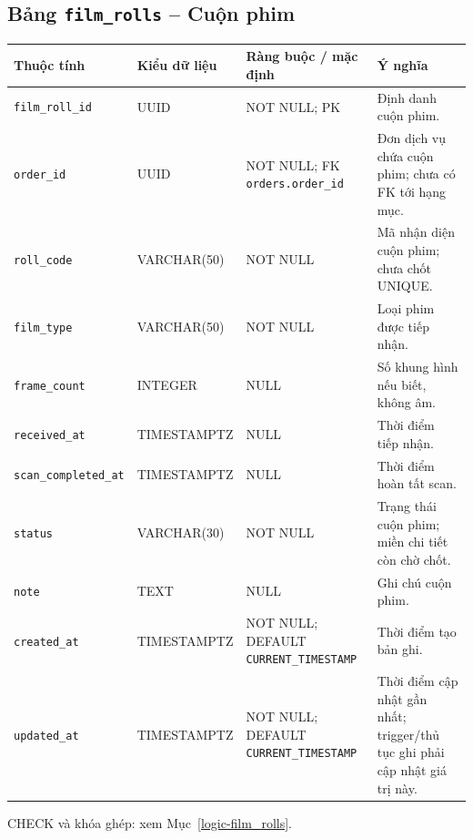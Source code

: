 \subsection{Bảng \texttt{film\_\allowbreak{}rolls} -- Cuộn phim}
\label{dictionary-film_rolls}
\begingroup
\footnotesize
\setlength{\tabcolsep}{3pt}
\begin{longtable}{>{\raggedright\arraybackslash}p{3.1cm}>{\raggedright\arraybackslash}p{2.5cm}>{\raggedright\arraybackslash}p{3.7cm}>{\raggedright\arraybackslash}p{4.3cm}}
\toprule
Thuộc tính & Kiểu dữ liệu & Ràng buộc / mặc định & Ý nghĩa \\
\midrule
\endhead
\texttt{film\_\allowbreak{}roll\_\allowbreak{}id} & UUID & NOT NULL; PK & Định danh cuộn phim. \\
\texttt{order\_\allowbreak{}id} & UUID & NOT NULL; FK \texttt{orders.order\_\allowbreak{}id} & Đơn dịch vụ chứa cuộn phim; chưa có FK tới hạng mục. \\
\texttt{roll\_\allowbreak{}code} & VARCHAR(50) & NOT NULL & Mã nhận diện cuộn phim; chưa chốt UNIQUE. \\
\texttt{film\_\allowbreak{}type} & VARCHAR(50) & NOT NULL & Loại phim được tiếp nhận. \\
\texttt{frame\_\allowbreak{}count} & INTEGER & NULL & Số khung hình nếu biết, không âm. \\
\texttt{received\_\allowbreak{}at} & TIMESTAMPTZ & NULL & Thời điểm tiếp nhận. \\
\texttt{scan\_\allowbreak{}completed\_\allowbreak{}at} & TIMESTAMPTZ & NULL & Thời điểm hoàn tất scan. \\
\texttt{status} & VARCHAR(30) & NOT NULL & Trạng thái cuộn phim; miền chi tiết còn chờ chốt. \\
\texttt{note} & TEXT & NULL & Ghi chú cuộn phim. \\
\texttt{created\_\allowbreak{}at} & TIMESTAMPTZ & NOT NULL; DEFAULT \texttt{CURRENT\_\allowbreak{}TIMESTAMP} & Thời điểm tạo bản ghi. \\
\texttt{updated\_\allowbreak{}at} & TIMESTAMPTZ & NOT NULL; DEFAULT \texttt{CURRENT\_\allowbreak{}TIMESTAMP} & Thời điểm cập nhật gần nhất; trigger/thủ tục ghi phải cập nhật giá trị này. \\
\bottomrule
\end{longtable}
\endgroup
CHECK và khóa ghép: xem Mục~\ref{logic-film_rolls}.
